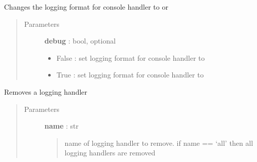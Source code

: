 \documentclass[letterpaper,10pt,english]{sphinxmanual}
\begin{document}
\begin{fulllineitems}
\label{pytan.utils:pytan.utils.change_console_format}
Changes the logging format for console handler to {\hyperref[pytan.constants:pytan.constants.DEBUG_FORMAT]{}} or {\hyperref[pytan.constants:pytan.constants.INFO_FORMAT]{}}
\begin{quote}\begin{description}
\item[{Parameters}] \leavevmode
\textbf{debug} : bool, optional
\begin{itemize}
\item {} 
False : set logging format for console handler to {\hyperref[pytan.constants:pytan.constants.INFO_FORMAT]{}}

\item {} 
True :  set logging format for console handler to {\hyperref[pytan.constants:pytan.constants.DEBUG_FORMAT]{}}

\end{itemize}

\end{description}\end{quote}

\end{fulllineitems}


\begin{fulllineitems}
\label{pytan.utils:pytan.utils.remove_logging_handler}
Removes a logging handler
\begin{quote}\begin{description}
\item[{Parameters}] \leavevmode
\textbf{name} : str
\begin{quote}

name of logging handler to remove. if name == `all' then all logging handlers are removed
\end{quote}

\end{description}\end{quote}

\end{fulllineitems}
\end{document}
